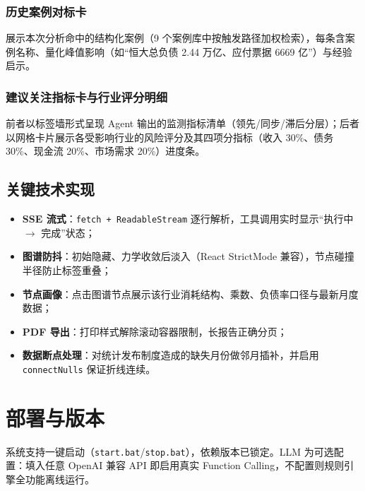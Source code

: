 \documentclass[12pt, a4paper]{ctexart}
\begin{document}
\subsubsection{历史案例对标卡}

展示本次分析命中的结构化案例（9 个案例库中按触发路径加权检索），每条含案例名称、量化峰值影响（如``恒大总负债 2.44 万亿、应付票据 6669 亿''）与经验启示。

\subsubsection{建议关注指标卡与行业评分明细}

前者以标签墙形式呈现 Agent 输出的监测指标清单（领先/同步/滞后分层）；后者以网格卡片展示各受影响行业的风险评分及其四项分指标（收入 30\%、债务 30\%、现金流 20\%、市场需求 20\%）进度条。

\subsection{关键技术实现}

\begin{itemize}[nosep]
  \item \textbf{SSE 流式}：\texttt{fetch + ReadableStream} 逐行解析，工具调用实时显示``执行中 $\to$ 完成''状态；
  \item \textbf{图谱防抖}：初始隐藏、力学收敛后淡入（React StrictMode 兼容），节点碰撞半径防止标签重叠；
  \item \textbf{节点画像}：点击图谱节点展示该行业消耗结构、乘数、负债率口径与最新月度数据；
  \item \textbf{PDF 导出}：打印样式解除滚动容器限制，长报告正确分页；
  \item \textbf{数据断点处理}：对统计发布制度造成的缺失月份做邻月插补，并启用 \texttt{connectNulls} 保证折线连续。
\end{itemize}

\section{部署与版本}

系统支持一键启动（\texttt{start.bat}/\texttt{stop.bat}），依赖版本已锁定。LLM 为可选配置：填入任意 OpenAI 兼容 API 即启用真实 Function Calling，不配置则规则引擎全功能离线运行。
\end{document}
